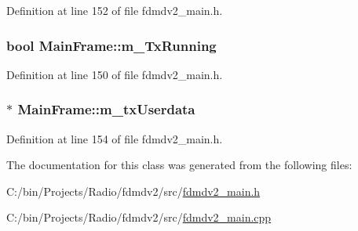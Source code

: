 Definition at line 152 of file fdmdv2\-\_\-main.\-h.

\hypertarget{class_main_frame_a8532b7b31adc84716e6edcf9c8d54192}{
\subsubsection[{m\-\_\-\-Tx\-Running}]{\setlength{\rightskip}{0pt plus 5cm}bool Main\-Frame\-::m\-\_\-\-Tx\-Running}}\label{class_main_frame_a8532b7b31adc84716e6edcf9c8d54192}


Definition at line 150 of file fdmdv2\-\_\-main.\-h.

\hypertarget{class_main_frame_a4e5eca6ff8ed0fd8cf67cdfeb04ce28e}{
\subsubsection[{m\-\_\-tx\-Userdata}]{$\ast$ Main\-Frame\-::m\-\_\-tx\-Userdata}}\label{class_main_frame_a4e5eca6ff8ed0fd8cf67cdfeb04ce28e}


Definition at line 154 of file fdmdv2\-\_\-main.\-h.



The documentation for this class was generated from the following files\-:\begin{DoxyCompactItemize}
\item 
C\-:/bin/\-Projects/\-Radio/fdmdv2/src/\hyperlink{fdmdv2__main_8h}{fdmdv2\-\_\-main.\-h}\item 
C\-:/bin/\-Projects/\-Radio/fdmdv2/src/\hyperlink{fdmdv2__main_8cpp}{fdmdv2\-\_\-main.\-cpp}\end{DoxyCompactItemize}
